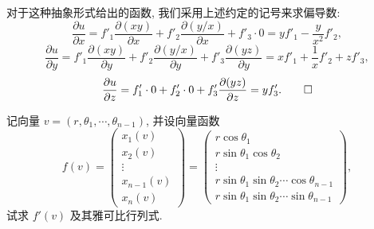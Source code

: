 \begin{solve}
对于这种抽象形式给出的函数, 我们采用上述约定的记号来求偏导数:
\[
  \frac{\partial u}{\partial x}
  =f'_1\frac{\partial(xy)}{\partial x}+f'_2\frac{\partial(y/x)}{\partial x}+f'_3\cdot0
  =yf'_1-\frac{y}{x^2}f'_2,
\]
\[
  \frac{\partial u}{\partial y}
  =f'_1\frac{\partial(xy)}{\partial y}
  +f'_2\frac{\partial(y/x)}{\partial y}
  +f'_3\frac{\partial(yz)}{\partial y}
  =xf'_1+\frac1x f'_2+zf'_3,
\]
\[
  \frac{\partial u}{\partial z}
  =f'_1\cdot0+f'_2\cdot0+f'_3\frac{\partial(yz)}{\partial z}
  =yf'_3.
\qedhere
\]
\end{solve}


\begin{example}\label{example:ma-14-2-3}
记向量 $v=(r,\theta_1,\cdots,\theta_{n-1})$, 并设向量函数
\[
  f(v)=
  \begin{pmatrix}
    x_1(v)\\
    x_2(v)\\
    \vdots\\
    x_{n-1}(v)\\
    x_n(v)
  \end{pmatrix}
  =
  \begin{pmatrix}
    r\cos\theta_1\\
    r\sin\theta_1\cos\theta_2\\
    \vdots\\
    r\sin\theta_1\sin\theta_2\cdots\cos\theta_{n-1}\\
    r\sin\theta_1\sin\theta_2\cdots\sin\theta_{n-1}
  \end{pmatrix},
\]
试求 $f'(v)$ 及其雅可比行列式.
\end{example}


